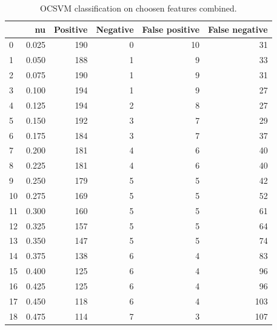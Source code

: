 \documentclass[a4paper,twoside,12pt]{book}
\begin{document}
\begin{appendices}

\begin{table}
	\centering
	\caption{OCSVM classification on choosen features combined.}
	\label{id:tab:OCSVMonProc}
	\begin{tabular}{lrrrrr}
		\toprule
		{} &     nu &  Positive &  Negative &  False positive &  False negative \\
		\midrule
		0  &  0.025 &       190 &         0 &              10 &              31 \\
		1  &  0.050 &       188 &         1 &               9 &              33 \\
		2  &  0.075 &       190 &         1 &               9 &              31 \\
		3  &  0.100 &       194 &         1 &               9 &              27 \\
		4  &  0.125 &       194 &         2 &               8 &              27 \\
		5  &  0.150 &       192 &         3 &               7 &              29 \\
		6  &  0.175 &       184 &         3 &               7 &              37 \\
		7  &  0.200 &       181 &         4 &               6 &              40 \\
		8  &  0.225 &       181 &         4 &               6 &              40 \\
		9  &  0.250 &       179 &         5 &               5 &              42 \\
		10 &  0.275 &       169 &         5 &               5 &              52 \\
		11 &  0.300 &       160 &         5 &               5 &              61 \\
		12 &  0.325 &       157 &         5 &               5 &              64 \\
		13 &  0.350 &       147 &         5 &               5 &              74 \\
		14 &  0.375 &       138 &         6 &               4 &              83 \\
		15 &  0.400 &       125 &         6 &               4 &              96 \\
		16 &  0.425 &       125 &         6 &               4 &              96 \\
		17 &  0.450 &       118 &         6 &               4 &             103 \\
		18 &  0.475 &       114 &         7 &               3 &             107 \\

\end{tabular}
\end{table}
\end{appendices}
\end{document}
